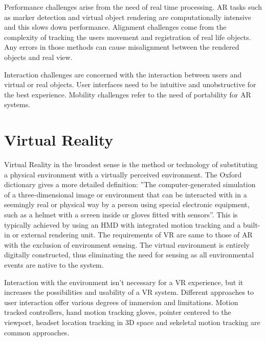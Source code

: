 \documentclass[12pt, a4paper,oneside, nocenter]{thesis}
\begin{document}
Performance challenges arise from the need of real time processing. AR tasks such as marker detection
and virtual object rendering are computationally intensive and this slows down performance.
Alignment challenges come from the complexity of tracking the users movement and registration of real
life objects. Any errors in those methods can cause misalignment between the rendered objects and
real view.\par
Interaction challenges are concerned with the interaction between users and virtual or real objects.
User interfaces need to be intuitive and unobstructive for the best experience. Mobility challenges refer
to the need of portability for AR systems.
\\
\section{Virtual Reality}
Virtual Reality in the broadest sense is the method or technology of substituting a physical environment with a virtually perceived environment. The Oxford dictionary gives a more detailed definition: 
''The computer-generated simulation of a three-dimensional image or environment that can be interacted with in a seemingly real or physical way by a person using special electronic equipment, such as a helmet with a screen inside or gloves fitted with sensors''.
This is typically achieved by using an HMD with integrated motion tracking and a built-in or external rendering unit.
The requirements of VR are same to those of AR with the exclusion of environment sensing. The virtual environment
is entirely digitally constructed, thus eliminating the need for sensing as all environmental events are native to the system.
\par
Interaction with the environment isn't necessary for a VR experience, but it increases the possibilities and usability of a VR system.
Different approaches to user interaction offer various degrees of immersion and limitations. Motion tracked controllers, hand motion tracking gloves, pointer centered to the viewport, headset location tracking in 3D space and sekeletal motion tracking are common approaches.
\end{document}
